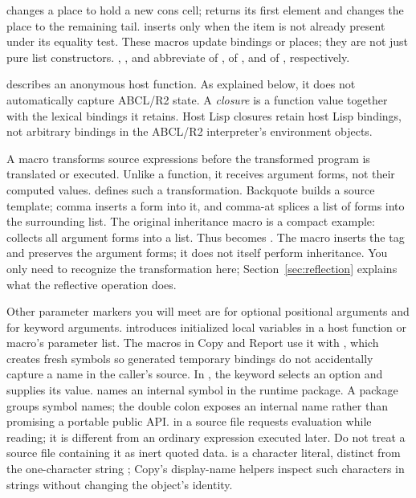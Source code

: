  changes a place to hold a new cons cell;  returns
its first element and changes the place to the remaining tail.
 inserts only when the item is not already present
under its equality test. These macros update bindings or places;
they are not just pure list constructors. , ,
and  abbreviate  of ,  of
, and  of , respectively.

 describes an anonymous host function. As explained below,
it does not automatically capture ABCL/R2 state.
A \emph{closure} is a function value together with the lexical bindings
it retains. Host Lisp closures retain host Lisp bindings, not arbitrary
bindings in the ABCL/R2 interpreter's environment objects.

A macro transforms source expressions before the transformed program
is translated or executed. Unlike a function, it receives argument forms,
not their computed values.  defines such a transformation.
Backquote builds a source template; comma inserts a form into it,
and comma-at splices a list of forms into the surrounding list.
The original inheritance macro is a compact example:
 collects all argument forms into a list.
Thus  becomes
.
The macro inserts the tag and preserves the argument forms; it does not
itself perform inheritance.
You only need to recognize the transformation here;
Section~\ref{sec:reflection} explains what the reflective operation does.

Other parameter markers you will meet are  for optional
positional arguments and  for keyword arguments.
 introduces initialized local variables in a host function
or macro's parameter list. The macros in Copy and Report use it with
, which creates fresh symbols so generated temporary
bindings do not accidentally capture a name in the caller's source.
In , the keyword selects an option
and  supplies its value.
 names an internal symbol in the runtime
package. A package groups symbol names; the double colon exposes an
internal name rather than promising a portable public API.
 in a source file requests evaluation while reading;
it is different from an ordinary expression executed later.
Do not treat a source file containing it as inert quoted data.
\code{\#\textbackslash{}>} is a character literal, distinct from the
one-character string ; Copy's display-name helpers inspect
such characters in strings without changing the object's identity.

